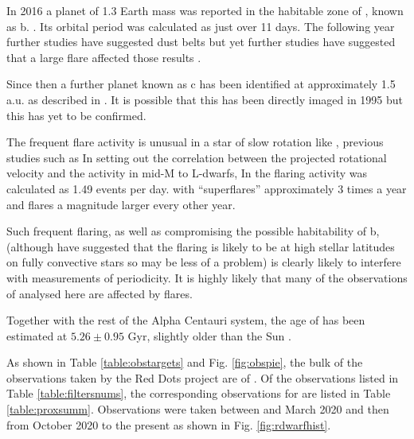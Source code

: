 In 2016 a planet of 1.3 Earth mass was reported in the habitable
zone of \prox, known as {\prox} b. \citep{angladaescude16}. Its orbital period was calculated as just over 11
days. The following year further studies have suggested dust belts \citep{anglada17} but yet further
studies have suggested that a large flare affected those results \citep{macgregor18}.

Since then a further planet known as {\prox} c has been identified at
approximately 1.5 a.u. as described in \citet{gratton20}. It is possible that
this has been directly imaged in 1995 but this has yet to be confirmed.

The frequent flare activity is unusual in a star of slow rotation like \prox,
previous studies such as In \citet{mohanty03} setting out the correlation
between the projected rotational velocity {\vsini} and the
activity in mid-M to L-dwarfs, In \citet{vida19} the flaring activity was
calculated as 1.49 events per day. with ``superflares'' approximately 3 times a
year and flares a magnitude larger every other year.

Such frequent flaring, as well as compromising the possible habitability of
{\prox} b, (although \citet{ilin21} have suggested that the flaring is likely
to be at high stellar latitudes on fully convective stars so may be less of
a problem) is clearly likely to interfere with measurements of periodicity.
It is highly likely that many of the observations of {\prox} analysed here are affected by
flares.

Together with the rest of the Alpha Centauri system, the age of {\prox} has been
estimated at $5.26 \pm 0.95$ Gyr, slightly older than the Sun \citep{joyce18}.

As shown in Table \ref{table:obstargets} and Fig. \ref{fig:obspie}, the bulk of
the observations taken by the Red Dots project are of \prox. Of the observations
listed in Table \ref{table:filtersnums}, the corresponding observations for
{\prox} are listed in Table \ref{table:proxsumm}. Observations were taken
between  and March 2020 and then from October 2020 to the
present as shown in Fig.
\ref{fig:rdwarfhist}.


